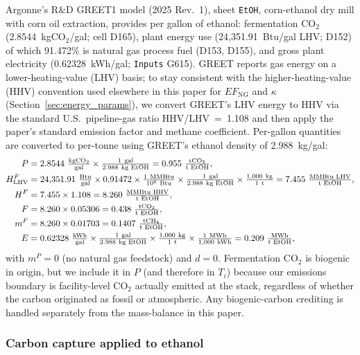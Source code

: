 \documentclass[11pt]{article}
\newcommand{\cotwo}{\ensuremath{\mathrm{CO_2}}}
\newcommand{\chfour}{\ensuremath{\mathrm{CH_4}}}
\begin{document}
Argonne's R\&D GREET1 model (2025 Rev.~1), sheet \texttt{EtOH}, corn-ethanol dry mill with corn oil extraction, provides per gallon of ethanol: fermentation \cotwo{} (2.8544~kg\cotwo{}/gal; cell D165), plant energy use (24{,}351.91~Btu/gal LHV; D152) of which 91.472\% is natural gas process fuel (D153, D155), and gross plant electricity (0.62328~kWh/gal; \texttt{Inputs} G615). GREET reports gas energy on a lower-heating-value (LHV) basis; to stay consistent with the higher-heating-value (HHV) convention used elsewhere in this paper for $EF_{\text{NG}}$ and $\kappa$ (Section~\ref{sec:energy_params}), we convert GREET's LHV energy to HHV via the standard U.S.\ pipeline-gas ratio HHV/LHV~=~1.108 and then apply the paper's standard emission factor and methane coefficient. Per-gallon quantities are converted to per-tonne using GREET's ethanol density of 2.988~kg/gal:
%
\begin{align*}
  P &= 2.8544~\tfrac{\text{kg\cotwo{}}}{\text{gal}} \times \tfrac{1~\text{gal}}{2.988~\text{kg EtOH}} = 0.955~\tfrac{\text{t\cotwo{}}}{\text{t EtOH}}, \\
  H^F_{\text{LHV}} &= 24{,}351.91~\tfrac{\text{Btu}}{\text{gal}} \times 0.91472 \times \tfrac{1~\text{MMBtu}}{10^{6}~\text{Btu}} \times \tfrac{1~\text{gal}}{2.988~\text{kg EtOH}} \times \tfrac{1{,}000~\text{kg}}{1~\text{t}} = 7.455~\tfrac{\text{MMBtu LHV}}{\text{t EtOH}}, \\
  H^F &= 7.455 \times 1.108 = 8.260~\tfrac{\text{MMBtu HHV}}{\text{t EtOH}}, \\
  F &= 8.260 \times 0.05306 = 0.438~\tfrac{\text{t\cotwo{}}}{\text{t EtOH}}, \\
  m^F &= 8.260 \times 0.01703 = 0.1407~\tfrac{\text{t\chfour{}}}{\text{t EtOH}}, \\
  E &= 0.62328~\tfrac{\text{kWh}}{\text{gal}} \times \tfrac{1~\text{gal}}{2.988~\text{kg EtOH}} \times \tfrac{1{,}000~\text{kg}}{1~\text{t}} \times \tfrac{1~\text{MWh}}{1{,}000~\text{kWh}} = 0.209~\tfrac{\text{MWh}}{\text{t EtOH}},
\end{align*}
%
with $m^P = 0$ (no natural gas feedstock) and $d = 0$. Fermentation \cotwo{} is biogenic in origin, but we include it in $P$ (and therefore in $T_i$) because our emissions boundary is facility-level \cotwo{} actually emitted at the stack, regardless of whether the carbon originated as fossil or atmospheric. Any biogenic-carbon crediting is handled separately from the mass-balance in this paper.

\subsubsection{Carbon capture applied to ethanol}
\end{document}
